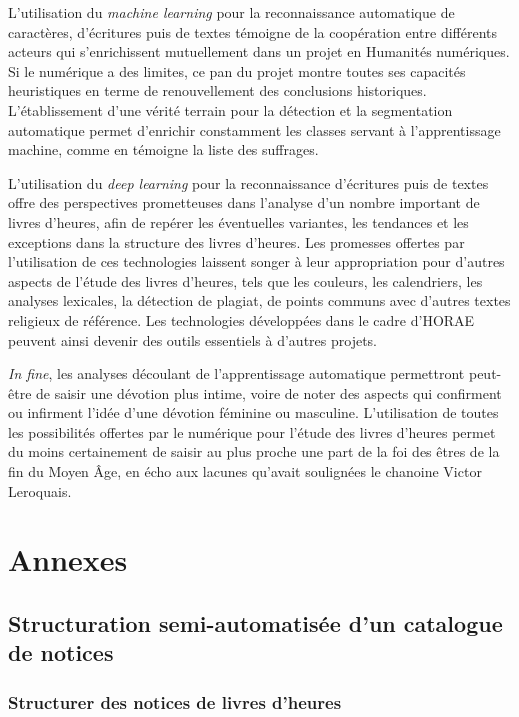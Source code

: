 \documentclass[a4paper,12pt,twoside]{book}
\begin{document}
	L'utilisation du \textit{machine learning} pour la reconnaissance automatique de caractères, d'écritures puis de textes témoigne de la coopération entre différents acteurs qui s'enrichissent mutuellement dans un projet en Humanités numériques. Si le numérique a des limites, ce pan du projet montre toutes ses capacités heuristiques en terme de renouvellement des conclusions historiques. L'établissement d'une vérité terrain pour la détection et la segmentation automatique permet d'enrichir constamment les classes servant à l'apprentissage machine, comme en témoigne la liste des suffrages. 
	
	L'utilisation du \textit{deep learning} pour la reconnaissance d'écritures puis de textes offre des perspectives prometteuses dans l'analyse d'un nombre important de livres d'heures, afin de repérer les éventuelles variantes, les tendances et les exceptions dans la structure des livres d'heures. Les promesses offertes par l'utilisation de ces technologies laissent songer à leur appropriation pour d'autres aspects de l'étude des livres d'heures, tels que les couleurs, les calendriers, les analyses lexicales, la détection de plagiat, de points communs avec d'autres textes religieux de référence. Les technologies développées dans le cadre d'HORAE peuvent ainsi devenir des outils essentiels à d'autres projets. 
	
	\textit{In fine}, les analyses découlant de l'apprentissage automatique permettront peut-être de saisir une dévotion plus intime, voire de noter des aspects qui confirment ou infirment l'idée d'une dévotion féminine ou masculine. L'utilisation de toutes les possibilités offertes par le numérique pour l'étude des livres d'heures permet du moins certainement de saisir au plus proche une part de la foi des êtres de la fin du Moyen Âge, en écho aux lacunes qu'avait soulignées le chanoine Victor Leroquais. 
	
	
	\appendix
	\part*{Annexes}	
	
	\chapter{Structuration semi-automatisée d'un catalogue de notices}
	
	\section{Structurer des notices de livres d'heures}
	
\end{document}

